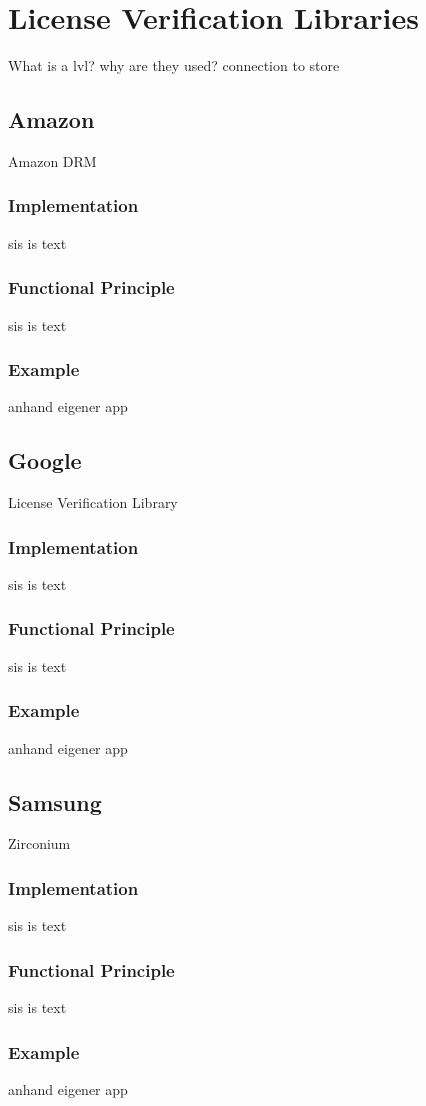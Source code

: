 \section{License Verification Libraries}\label{section:lvl}
What is a lvl? why are they used? connection to store
\subsection{Amazon}\label{subsection:lvl-amazon}
Amazon DRM
\subsubsection{Implementation}\label{subsection:lvl-amazon-implementation}
sis is text
\subsubsection{Functional Principle}\label{subsection:lvl-amazon-functional}
sis is text
\subsubsection{Example}\label{subsection:lvl-amazon-example}
anhand eigener app
\subsection{Google}\label{subsection:lvl-google}
License Verification Library
\subsubsection{Implementation}\label{subsection:lvl-google-implementation}
sis is text
\subsubsection{Functional Principle}\label{subsection:lvl-google-functional}
sis is text
\subsubsection{Example}\label{subsection:lvl-google-example}
anhand eigener app
\subsection{Samsung}\label{subsection:lvl-samsung}
Zirconium
\subsubsection{Implementation}\label{subsection:lvl-samsung-implementation}
sis is text
\subsubsection{Functional Principle}\label{subsection:lvl-samsung-functional}
sis is text
\subsubsection{Example}\label{subsection:lvl-samsung-example}
anhand eigener app
